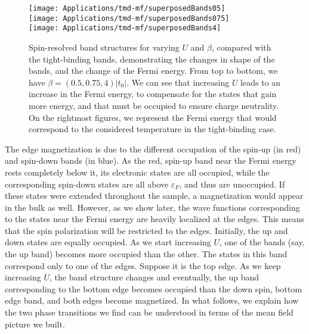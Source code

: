 \begin{figure}[H]
\centering
\texttt{[image: Applications/tmd-mf/superposedBands05]} \\
\texttt{[image: Applications/tmd-mf/superposedBands075]} \\
\texttt{[image: Applications/tmd-mf/superposedBands4]} \\
	\caption[Spin-resolved band structures for varying $U$ and $\beta$, compared with the tight-binding bands.]{Spin-resolved band structures for varying $U$ and $\beta$, compared with the tight-binding bands, demonstrating the changes in shape of the bands, and the change of the Fermi energy.
	From top to bottom, we have $\beta = (0.5, 0.75, 4)| t_0 |$.
	We can see that increasing $U$ leads to an increase in the Fermi energy, to compensate for the states that gain more energy, and that must be occupied to ensure charge neutrality.
	On the rightmost figures, we represent the Fermi energy that would correspond to the  considered temperature in the tight-binding case.}
	\label{fig:band-structures}
\end{figure}
The edge magnetization is due to the different occupation of the spin-up (in red) and spin-down bands (in blue).
As the red, spin-up band near the Fermi energy rests completely below it, its electronic states are all occupied, while the corresponding spin-down states are all above $\varepsilon_F$, and thus are unoccupied.
If these states were extended throughout the sample, a magnetization would appear in the bulk as well.
However, as we show later, the wave functions corresponding to the states near the Fermi energy are heavily localized at the edges.
This means that the spin polarization will be restricted to the edges.
Initially, the up and down states are equally occupied.
As we start increasing $U$, one of the bands (say, the up band) becomes more occupied than the other.
The states in this band correspond only to one of the edges.
Suppose it is the top edge.
As we keep increasing $U$, the band structure changes and eventually, the up band corresponding to the bottom edge becomes occupied than the down spin, bottom edge band, and both edges become magnetized.
In what follows, we explain how the two phase transitions we find can be understood in terms of the mean field picture we built.

